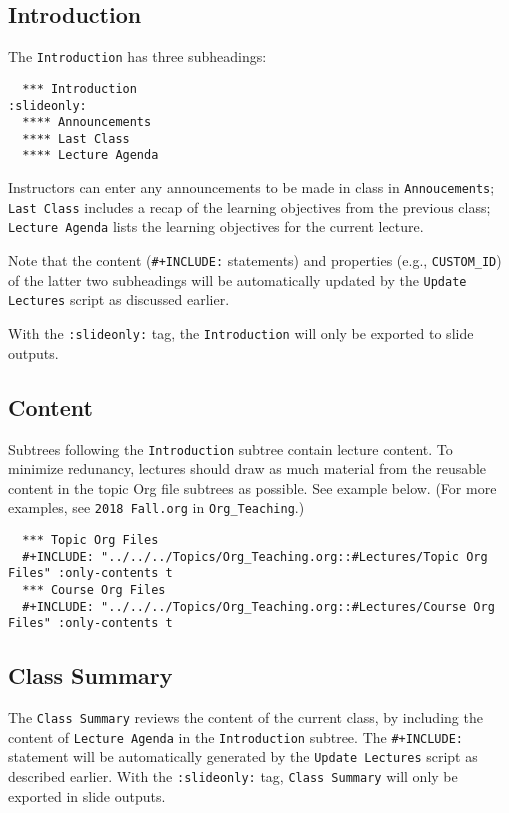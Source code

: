 \documentclass[10pt,article]{article}
\begin{document}
\subsection{Introduction}
\label{sec:org6f5f708}
The \texttt{Introduction} has three subheadings:

{\small
\begin{verbatim}
  *** Introduction                                                :slideonly:
  **** Announcements
  **** Last Class
  **** Lecture Agenda
\end{verbatim}
}

Instructors can enter any announcements to be made in class in \texttt{Annoucements};
\texttt{Last Class} includes a recap of the learning objectives from the previous
class; \texttt{Lecture Agenda} lists the learning objectives for the current lecture.

Note that the content (\texttt{\#+INCLUDE:} statements) and properties (e.g.,
\texttt{CUSTOM\_ID}) of the latter two subheadings will be automatically updated by the \texttt{Update Lectures}
script as discussed earlier.

With the \texttt{:slideonly:} tag, the \texttt{Introduction} will only be exported to slide
outputs.
\subsection{Content}
\label{sec:org9ac3224}
Subtrees following the \texttt{Introduction} subtree contain lecture content.
To minimize redunancy, lectures should draw as much material from the reusable
content in the topic Org file subtrees as possible. See example
below. (For more examples, see \texttt{2018 Fall.org} in \texttt{Org\_Teaching}.)

{\footnotesize
\begin{verbatim}
  *** Topic Org Files
  #+INCLUDE: "../../../Topics/Org_Teaching.org::#Lectures/Topic Org Files" :only-contents t
  *** Course Org Files
  #+INCLUDE: "../../../Topics/Org_Teaching.org::#Lectures/Course Org Files" :only-contents t
\end{verbatim}
}

\subsection{Class Summary}
\label{sec:orgd89805c}
The \texttt{Class Summary} reviews the content of the current class, by including the content of \texttt{Lecture
Agenda} in the \texttt{Introduction} subtree.  The \texttt{\#+INCLUDE:} statement will be
automatically generated by the \texttt{Update Lectures} script as described earlier.
With the \texttt{:slideonly:} tag, \texttt{Class Summary} will only be exported in slide outputs.
\end{document}
